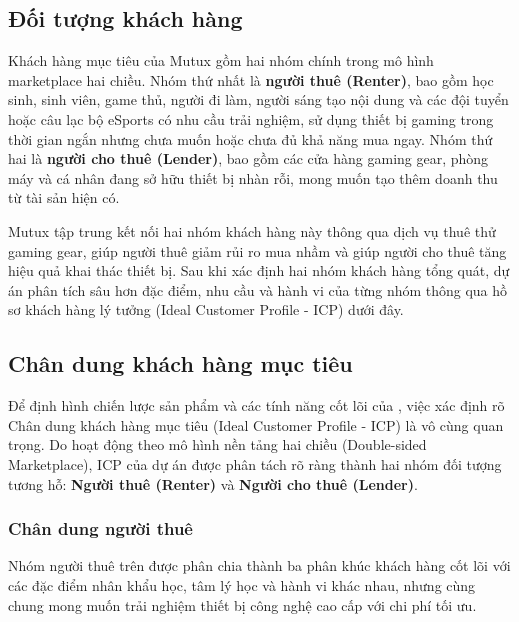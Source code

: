 \subsection{Đối tượng khách hàng}

Khách hàng mục tiêu của Mutux gồm hai nhóm chính trong mô hình marketplace hai chiều. Nhóm thứ nhất là \textbf{người thuê (Renter)}, bao gồm học sinh, sinh viên, game thủ, người đi làm, người sáng tạo nội dung và các đội tuyển hoặc câu lạc bộ eSports có nhu cầu trải nghiệm, sử dụng thiết bị gaming trong thời gian ngắn nhưng chưa muốn hoặc chưa đủ khả năng mua ngay. Nhóm thứ hai là \textbf{người cho thuê (Lender)}, bao gồm các cửa hàng gaming gear, phòng máy và cá nhân đang sở hữu thiết bị nhàn rỗi, mong muốn tạo thêm doanh thu từ tài sản hiện có.

Mutux tập trung kết nối hai nhóm khách hàng này thông qua dịch vụ thuê thử gaming gear, giúp người thuê giảm rủi ro mua nhầm và giúp người cho thuê tăng hiệu quả khai thác thiết bị. Sau khi xác định hai nhóm khách hàng tổng quát, dự án phân tích sâu hơn đặc điểm, nhu cầu và hành vi của từng nhóm thông qua hồ sơ khách hàng lý tưởng (Ideal Customer Profile - ICP) dưới đây.


\subsection{Chân dung khách hàng mục tiêu}

Để định hình chiến lược sản phẩm và các tính năng cốt lõi của \projectname{}, việc xác định rõ Chân dung khách hàng mục tiêu (Ideal Customer Profile - ICP) là vô cùng quan trọng. Do \projectname{} hoạt động theo mô hình nền tảng hai chiều (Double-sided Marketplace), ICP của dự án được phân tách rõ ràng thành hai nhóm đối tượng tương hỗ: \textbf{Người thuê (Renter)} và \textbf{Người cho thuê (Lender)}.

\subsubsection{Chân dung người thuê}

Nhóm người thuê trên \projectname{} được phân chia thành ba phân khúc khách hàng cốt lõi với các đặc điểm nhân khẩu học, tâm lý học và hành vi khác nhau, nhưng cùng chung mong muốn trải nghiệm thiết bị công nghệ cao cấp với chi phí tối ưu.

